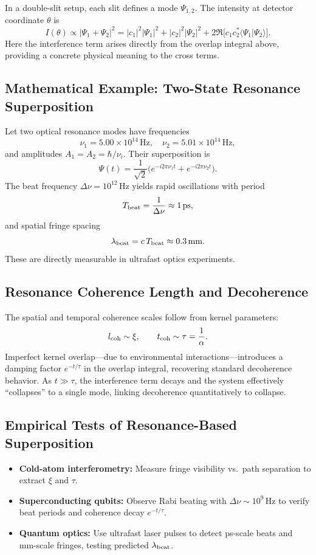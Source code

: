 In a double-slit setup, each slit defines a mode \(\Psi_{1,2}\).  The intensity at detector coordinate \(\theta\) is
\[
I(\theta)
\propto|\Psi_1+\Psi_2|^2
=|c_1|^2|\Psi_1|^2+|c_2|^2|\Psi_2|^2
+2\Re\bigl[c_1c_2^*\langle\Psi_1|\Psi_2\rangle\bigr].
\]
Here the interference term arises directly from the overlap integral above, providing a concrete physical meaning to the cross terms.

\subsection{Mathematical Example: Two-State Resonance Superposition}

Let two optical resonance modes have frequencies
\[
\nu_1=5.00\times10^{14}\,\mathrm{Hz},\quad
\nu_2=5.01\times10^{14}\,\mathrm{Hz},
\]
and amplitudes \(A_1=A_2=\hbar/\nu_i\).  Their superposition is
\[
\Psi(t)=\frac{1}{\sqrt2}\bigl(e^{-i2\pi\nu_1 t}+e^{-i2\pi\nu_2 t}\bigr).
\]
The beat frequency \(\Delta\nu=10^{12}\,\mathrm{Hz}\) yields rapid oscillations with period
\[
T_{\rm beat}=\frac{1}{\Delta\nu}\approx1\,\mathrm{ps},
\]
and spatial fringe spacing
\[
\lambda_{\rm beat}=c\,T_{\rm beat}\approx0.3\,\mathrm{mm}.
\]
These are directly measurable in ultrafast optics experiments.

\subsection{Resonance Coherence Length and Decoherence}

The spatial and temporal coherence scales follow from kernel parameters:
\[
l_{\rm coh}\sim\xi,\qquad
t_{\rm coh}\sim\tau=\frac{1}{\alpha}.
\]
Imperfect kernel overlap—due to environmental interactions—introduces a damping factor \(e^{-t/\tau}\) in the overlap integral, recovering standard decoherence behavior.  As \(t\gg\tau\), the interference term decays and the system effectively “collapses” to a single mode, linking decoherence quantitatively to collapse.

\subsection{Empirical Tests of Resonance-Based Superposition}

\begin{itemize}
  \item \textbf{Cold-atom interferometry:} Measure fringe visibility vs.\ path separation to extract \(\xi\) and \(\tau\).  
  \item \textbf{Superconducting qubits:} Observe Rabi beating with \(\Delta\nu\sim10^9\)\,Hz to verify beat periods and coherence decay \(e^{-t/\tau}\).  
  \item \textbf{Quantum optics:} Use ultrafast laser pulses to detect ps-scale beats and mm-scale fringes, testing predicted \(\lambda_{\rm beat}\).
\end{itemize}

